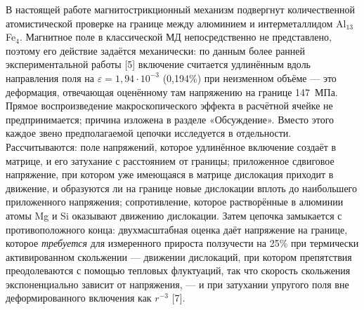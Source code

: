 В настоящей работе магнитострикционный механизм подвергнут количественной
атомистической проверке на границе между алюминием и интерметаллидом
Al$_{13}$Fe$_4$. Магнитное поле в классической МД непосредственно не
представлено, поэтому его действие задаётся механически: по данным более
ранней экспериментальной работы [5] включение считается удлинённым вдоль
направления поля на $\varepsilon = 1{,}94\cdot10^{-3}$ (0{,}194\%) при
неизменном объёме --- это деформация, отвечающая оценённому там напряжению
на границе 147~МПа. Прямое воспроизведение макроскопического эффекта в
расчётной ячейке не предпринимается; причина изложена в разделе
«Обсуждение». Вместо этого каждое звено предполагаемой цепочки исследуется в
отдельности. Рассчитываются: поле напряжений, которое удлинённое включение
создаёт в матрице, и его затухание с расстоянием от границы; приложенное
сдвиговое напряжение, при котором уже имеющаяся в матрице дислокация
приходит в движение, и образуются ли на границе новые дислокации вплоть до наибольшего приложенного напряжения; сопротивление, которое растворённые в алюминии атомы Mg и Si
оказывают движению дислокации. Затем цепочка замыкается с противоположного
конца: двухмасштабная оценка даёт напряжение на границе, которое
\emph{требуется} для измеренного прироста ползучести на 25\% при термически
активированном скольжении --- движении дислокаций, при котором препятствия
преодолеваются с помощью тепловых флуктуаций, так что скорость скольжения
экспоненциально зависит от напряжения, --- и при затухании упругого поля
вне деформированного включения как $r^{-3}$ [7].